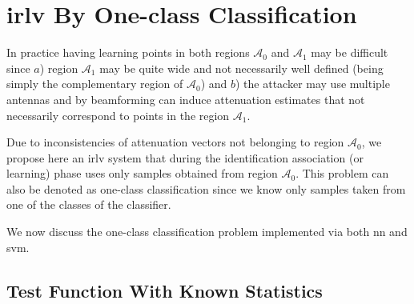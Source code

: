 \documentclass[draftcls,onecolumn,12pt]{IEEEtran}
\newcommand{\A}[1]{\mathcal{A}_#1}
\begin{document}

\section{\ac{irlv} By One-class Classification}
\label{sec:OneClass}
 

In practice having learning points in both regions $\A{0}$ and $\A{1}$ may be difficult since $a$) region $\A{1}$ may be quite wide and not necessarily well defined (being simply the complementary region of $\A{0}$) and $b$) the attacker may use multiple antennas and by beamforming  can induce attenuation estimates that not necessarily correspond to points in the region $\A{1}$. %

Due to inconsistencies of attenuation vectors not belonging to region $\A{0}$, we propose here an \ac{irlv} system that during the identification association (or learning) phase uses only samples obtained from region $\A{0}$. This problem can also be denoted as one-class classification since we know only samples taken from one of the classes of the classifier. 

We now discuss the one-class classification problem implemented via both \ac{nn} and \ac{svm}.
 

\subsection{Test Function With Known Statistics}
\label{sec:oneClassOpt}
\end{document}
